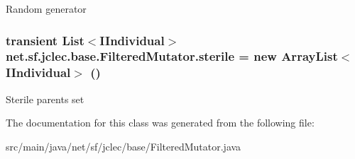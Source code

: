 Random generator \hypertarget{classnet_1_1sf_1_1jclec_1_1base_1_1_filtered_mutator_a71f85310ce71199fa74922a7ed4d8088}{
\subsubsection[{sterile}]{\setlength{\rightskip}{0pt plus 5cm}transient List$<${\bf I\-Individual}$>$ net.\-sf.\-jclec.\-base.\-Filtered\-Mutator.\-sterile = new Array\-List$<${\bf I\-Individual}$>$ ()\hspace{0.3cm}{\ttfamily [protected]}}}\label{classnet_1_1sf_1_1jclec_1_1base_1_1_filtered_mutator_a71f85310ce71199fa74922a7ed4d8088}
Sterile parents set 

The documentation for this class was generated from the following file\-:\begin{DoxyCompactItemize}
\item 
src/main/java/net/sf/jclec/base/Filtered\-Mutator.\-java\end{DoxyCompactItemize}
